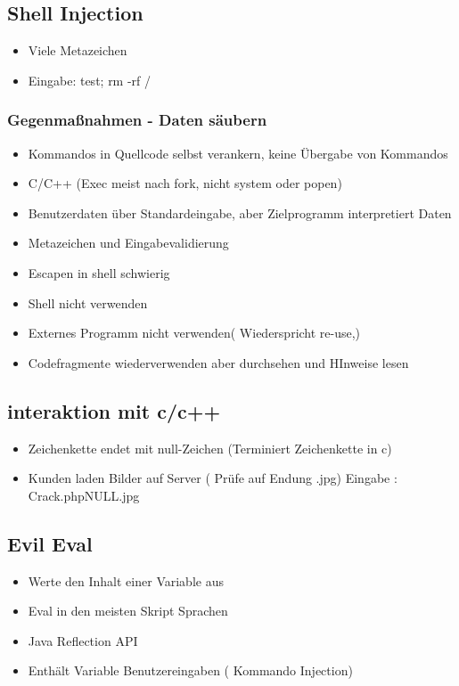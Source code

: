 \subsection*{ Shell Injection}
\begin{itemize}
	\item Viele Metazeichen
	\item Eingabe: test; rm -rf /
\end{itemize}
\subsubsection*{ Gegenmaßnahmen - Daten säubern }
\begin{itemize}
	\item Kommandos in Quellcode selbst verankern, keine Übergabe von Kommandos
	\item C/C++ (Exec  meist nach fork, nicht system oder popen)
	\item Benutzerdaten über Standardeingabe, aber Zielprogramm interpretiert Daten
	\item Metazeichen und Eingabevalidierung
	\item Escapen in shell schwierig
	\item Shell nicht verwenden
	\item Externes Programm nicht verwenden( Wiederspricht re-use,)
	\item Codefragmente wiederverwenden aber durchsehen und HInweise lesen
\end{itemize}

\subsection*{ interaktion mit c/c++ }
\begin{itemize}
\item Zeichenkette endet mit null-Zeichen (Terminiert Zeichenkette in c)
\item Kunden laden Bilder auf Server ( Prüfe auf Endung .jpg) Eingabe : Crack.phpNULL.jpg
\end{itemize}

\subsection*{ Evil Eval }
\begin{itemize}
	\item Werte den Inhalt einer Variable aus
	\item Eval in den meisten Skript Sprachen
	\item Java Reflection API
	\item Enthält Variable Benutzereingaben ( Kommando Injection)
\end{itemize}

